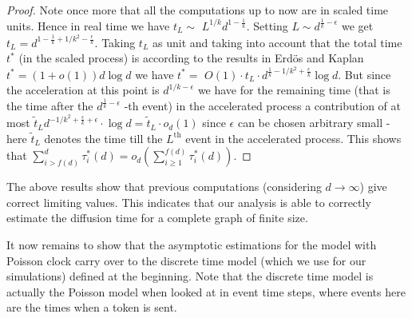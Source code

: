\begin{proof}
Note once more that all the computations up to now are in scaled time units.
Hence in real time we have $t_{L}\sim $ $L^{1/k}d^{1-\frac{1}{k}}.$ Setting $%
L\sim d^{\frac{1}{k}-\epsilon }$ we get $t_{L}=d^{1-\frac{1}{k}+1/k^{2}-%
\frac{\epsilon }{k}}.$ Taking $t_{L}$ as unit and taking into account that
the total time $t^{\ast }$ (in the scaled process) is according to the
results in Erd\"{o}s and Kaplan \cite{kaplan1977generalization} $t^{\ast
}=\left( 1+o\left( 1\right) \right) d\log d$ we have $t^{\ast }=$ $O\left(
1\right) \cdot t_{L}\cdot d^{\frac{1}{k}-1/k^{2}+\frac{\epsilon }{k}}\log d.$
But since the acceleration at this point is $d^{1/k-\epsilon }$ we have for
the remaining time (that is the time after the $d^{\frac{1}{k}-\epsilon }$%
-th event) in the accelerated process a contribution of at most $\tilde{t}%
_{L}d^{-1/k^{2}+\frac{\epsilon }{k}+\epsilon }\cdot \log d=\tilde{t}%
_{L}\cdot o_{d}\left( 1\right) $ since $\epsilon $ can be chosen arbitrary
small - here $\tilde{t}_{L}$ denotes the time till the $L^\textrm{th}$ event in the
accelerated process. This shows that $\sum_{i>f\left( d\right) }^{d}\tau
_{i}^{\ast }\left( d\right) =o_{d}\left( \sum_{i\geq 1}^{f\left( d\right)
}\tau _{i}^{\ast }\left( d\right) \right) .$

\end{proof}

{The above results show that previous computations (considering $d\rightarrow \infty$) give correct limiting values. 
This indicates that our analysis is able to correctly estimate the diffusion time for a complete graph of finite size.}


It now remains to show that the asymptotic estimations for the model with
Poisson clock carry over to the discrete time model (which we use for our simulations) defined at the
beginning. Note that the discrete time model is actually the Poisson
model when looked at in event time steps, where events here are the
times when a token is sent. 

